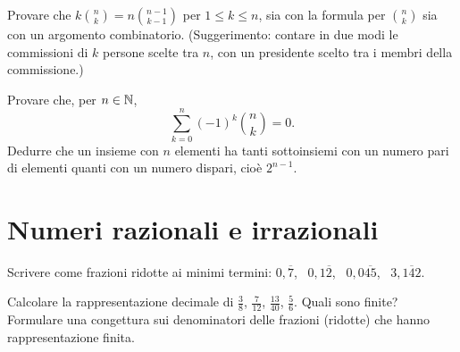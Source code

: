 \begin{esercizio}[\liv{3}]
Provare che $k\binom nk=n\binom{n-1}{k-1}$ per $1\le k\le n$, sia con la formula per $\binom nk$ sia con un argomento combinatorio. (Suggerimento: contare in due modi le commissioni di $k$ persone scelte tra $n$, con un presidente scelto tra i membri della commissione.)
\end{esercizio}

\begin{esercizio}[\liv{3}]
Provare che, per $n\in\mathbb N$,
\[
\sum_{k=0}^{n}(-1)^{k}\binom nk=0.
\]
Dedurre che un insieme con $n$ elementi ha tanti sottoinsiemi con un numero pari di elementi quanti con un numero dispari, cio\`e $2^{n-1}$.
\end{esercizio}

\section{Numeri razionali e irrazionali}

\begin{esercizio}[\liv{1}]
Scrivere come frazioni ridotte ai minimi termini: $0{,}\overline{7}$, \ $0{,}1\overline{2}$, \ $0{,}0\overline{45}$, \ $3{,}\overline{142}$.
\end{esercizio}

\begin{esercizio}[\liv{1}]
Calcolare la rappresentazione decimale di $\frac38$, $\frac7{12}$, $\frac{13}{40}$, $\frac{5}{6}$. Quali sono finite? Formulare una congettura sui denominatori delle frazioni (ridotte) che hanno rappresentazione finita.
\end{esercizio}

